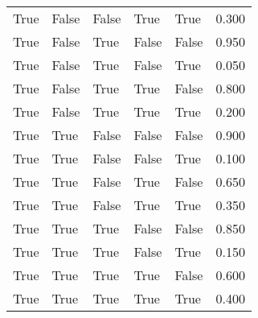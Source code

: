 \begin{tabular}{lllllr}
        True &         False &                False &     True &          True & 0.300 \\
        True &         False &                 True &    False &         False & 0.950 \\
        True &         False &                 True &    False &          True & 0.050 \\
        True &         False &                 True &     True &         False & 0.800 \\
        True &         False &                 True &     True &          True & 0.200 \\
        True &          True &                False &    False &         False & 0.900 \\
        True &          True &                False &    False &          True & 0.100 \\
        True &          True &                False &     True &         False & 0.650 \\
        True &          True &                False &     True &          True & 0.350 \\
        True &          True &                 True &    False &         False & 0.850 \\
        True &          True &                 True &    False &          True & 0.150 \\
        True &          True &                 True &     True &         False & 0.600 \\
        True &          True &                 True &     True &          True & 0.400 \\
\bottomrule
\end{tabular}

